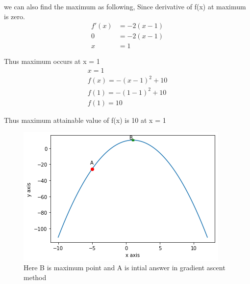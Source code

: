 \begin{enumerate}[label=\thesection.\arabic*.,ref=\thesection.\theenumi]
    
    we can also find the maximum as following, Since derivative of f(x) at maximum is zero.
    \begin{align}
        f'(x) &= -2(x-1) \\
        0 &= -2(x-1) \\
        x &= 1
    \end{align}
    
    Thus maximum occurs at x = 1 \\
    \begin{align}
        x = 1 \\
        f(x) = -(x-1)^2+10 \\
        f(1) = -(1-1)^2+10 \\
        f(1) = 10
    \end{align}
    
    Thus maximum attainable value of f(x) is 10 at x = 1 \\
    
    \begin{figure}[h]
    \includegraphics[width=\columnwidth]{Figure_1.png}
    \caption{Here B is maximum point and A is intial answer in gradient ascent method}
    \end{figure}\\


\end{enumerate}
